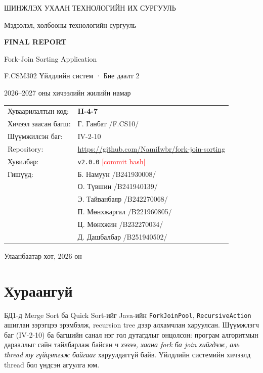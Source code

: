 \documentclass[11pt,a4paper]{article}
\newcommand{\todo}[1]{\textcolor{red}{[#1]}}
\begin{document}
\begin{titlepage}
\centering
{\large ШИНЖЛЭХ УХААН ТЕХНОЛОГИЙН ИХ СУРГУУЛЬ\par}
{Мэдээлэл, холбооны технологийн сургууль\par}
\vspace{3cm}
{\Huge\bfseries FINAL REPORT\par}
\vspace{0.6cm}
{\Large Fork-Join Sorting Application\par}
\vspace{0.4cm}
{F.CSM302 Үйлдлийн систем · Бие даалт 2\par}
{2026--2027 оны хичээлийн жилийн намар\par}
\vfill
\begin{tabular}{ll}
Хуваарилалтын код: & \textbf{II-4-7} \\
Хичээл заасан багш: & Г. Ганбат /F.CS10/ \\
Шүүмжилсэн баг: & IV-2-10 \\
Repository: & \url{https://github.com/NamiIwbr/fork-join-sorting} \\
Хувилбар: & \texttt{v2.0.0} \todo{commit hash} \\[6pt]
Гишүүд: & Б. Намуун /B241930008/ \\
 & О. Түвшин /B241940139/ \\
 & Э. Тайванбаяр /B242270068/ \\
 & П. Мөнхжаргал /B221960805/ \\
 & Ц. Мөнхжин /B232270034/ \\
 & Д. Дашбалбар /B251940502/ \\
\end{tabular}
\vspace{2cm}

Улаанбаатар хот, 2026 он
\end{titlepage}

\section*{Хураангуй}

БД1-д Merge Sort ба Quick Sort-ийг Java-ийн \texttt{ForkJoinPool}, \texttt{RecursiveAction} ашиглан зэрэгцээ
эрэмбэлж, recursion tree дээр алхамчлан харуулсан. Шүүмжлэгч баг (IV-2-10) ба багшийн санал нэг гол дутагдлыг
онцолсон: програм алгоритмын дарааллыг сайн тайлбарлаж байсан ч \emph{хэзээ, хаана fork ба join хийгдэж, аль
thread юу гүйцэтгэж байгааг} харуулдаггүй байв. Үйлдлийн системийн хичээлд thread бол үндсэн агуулга юм.
\end{document}
